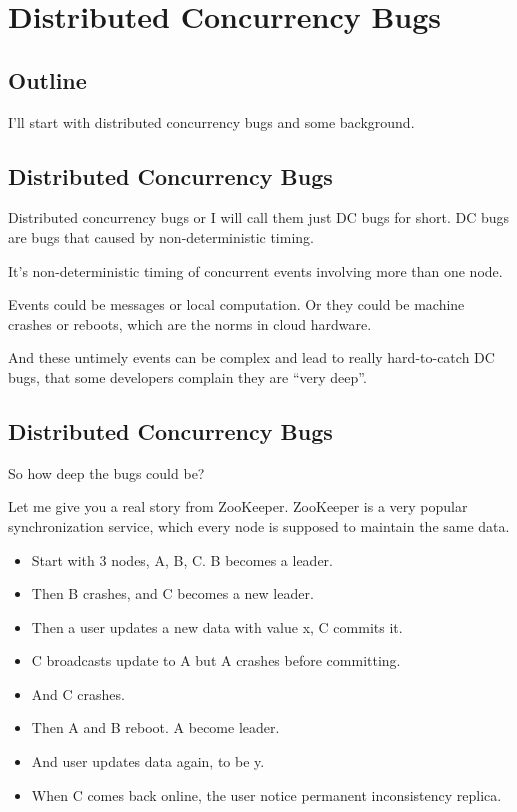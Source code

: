 
\section{Distributed Concurrency Bugs}

\subsection{Outline}

I'll start with distributed concurrency bugs and some background.

\subsection{Distributed Concurrency Bugs}

Distributed concurrency bugs or I will call them just DC bugs for short. DC bugs
are bugs that caused by non-deterministic timing.

It's non-deterministic timing of concurrent events involving more than one node.

Events could be messages or local computation. Or they could be machine crashes
or reboots, which are the norms in cloud hardware.

And these untimely events can be complex and lead to really hard-to-catch DC
bugs, that some developers complain they are ``very deep''.

\subsection{Distributed Concurrency Bugs}

So how deep the bugs could be?

Let me give you a real story from ZooKeeper. ZooKeeper is a very popular
synchronization service, which every node is supposed to maintain the same data.

\begin{itemize}
\item Start with 3 nodes, A, B, C. B becomes a leader.
\item Then B crashes, and C becomes a new leader.
\item Then a user updates a new data with value x, C commits it.
\item C broadcasts update to A but A crashes before committing.
\item And C crashes.
\item Then A and B reboot. A become leader.
\item And user updates data again, to be y.
\item When C comes back online, the user notice permanent inconsistency replica.
\end{itemize}

